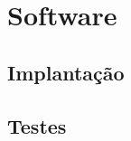 \chapter{Software} \label{cha:software}

\section{Implantação} \label{sec:software:implantacao}

\section{Testes} \label{sec:software:testes}